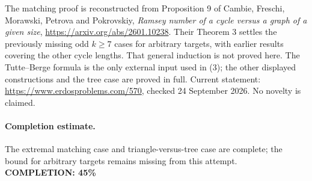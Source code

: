 The matching proof is reconstructed from Proposition 9 of
Cambie, Freschi, Morawski, Petrova and Pokrovskiy,
\emph{Ramsey number of a cycle versus a graph of a given size},
\url{https://arxiv.org/abs/2601.10238}.
Their Theorem 3 settles the previously missing odd \(k\geq7\)
cases for arbitrary targets, with earlier results covering the other
cycle lengths. That general induction is not proved here.
The Tutte--Berge formula is the only external input used in (3);
the other displayed constructions and the tree case are proved in full.
Current statement: \url{https://www.erdosproblems.com/570},
checked 24 September 2026. No novelty is claimed.

\paragraph{Completion estimate.}
The extremal matching case and triangle-versus-tree case are complete;
the bound for arbitrary targets remains missing from this attempt.
\textbf{COMPLETION: 45\%}
